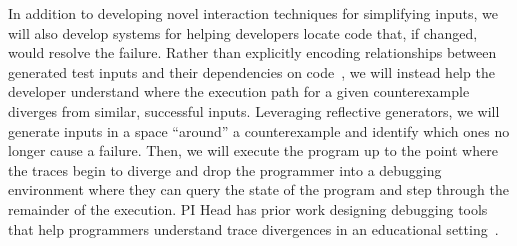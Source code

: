 
In addition to developing novel interaction techniques for simplifying inputs,
we will also develop systems for helping developers locate code that, if
changed, would resolve the failure. Rather than explicitly encoding
relationships between generated test inputs
and their dependencies on
code~\cite{ref:ko2009finding}, we will instead help the developer
understand where the execution path for a given counterexample diverges from
similar, successful inputs.
Leveraging
reflective generators, we will generate inputs in a space ``around'' a
counterexample and identify which ones no longer cause a failure.  Then, we will
execute the program up to the point where the traces begin to
diverge and drop the programmer into a debugging environment where
they can query the state of the program and step through the remainder of the
execution. PI Head has prior work designing debugging tools that help
programmers understand trace divergences in an educational
setting~\cite{ref:suzuki2017tracediff}.

